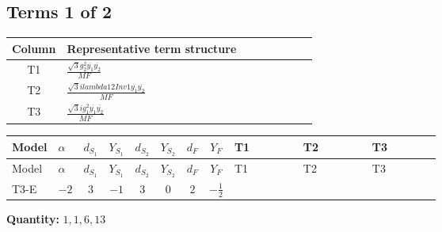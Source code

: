 \documentclass[8pt]{article}
\begin{document}
\begin{landscape}
\subsection*{Terms 1 of 2}
\begin{center}
\begin{tabular}{@{}c >{\raggedright\arraybackslash}p{0.82\linewidth}@{}}
\toprule
Column & Representative term structure \\
\midrule
T1 & \(\displaystyle \frac{\sqrt{3} g_{2}^{2} \overline{y_{1}} \overline{y_{2}}}{MF}\) \\
\midrule
T2 & \(\displaystyle \frac{\sqrt{3} i lambda12Inv1 \overline{y_{1}} \overline{y_{2}}}{MF}\) \\
\midrule
T3 & \(\displaystyle \frac{\sqrt{3} i g_{1}^{2} \overline{y_{1}} \overline{y_{2}}}{MF}\) \\
\midrule
\bottomrule
\end{tabular}
\end{center}
\smallskip
\tiny
\begin{longtable}{@{}llcccccc >{\raggedright\arraybackslash}p{0.21\linewidth} >{\raggedright\arraybackslash}p{0.21\linewidth} >{\raggedright\arraybackslash}p{0.21\linewidth}@{}}
\toprule
Model & $\alpha$ & $d_{S_1}$ & $Y_{S_1}$ & $d_{S_2}$ & $Y_{S_2}$ & $d_F$ & $Y_F$ & T1 & T2 & T3 \\
\midrule
\endfirsthead
\toprule
Model & $\alpha$ & $d_{S_1}$ & $Y_{S_1}$ & $d_{S_2}$ & $Y_{S_2}$ & $d_F$ & $Y_F$ & T1 & T2 & T3 \\
\midrule
\endhead
T3-E & $-2$ & $3$ & $-1$ & $3$ & $0$ & $2$ & $-\frac{1}{2}$ & \scriptsize\adjustbox{max width=\linewidth}{$\begin{gathered} - \frac{\sqrt{3} g_{2}^{2} \overline{y_{1}} \overline{y_{2}}}{6 MF}\end{gathered}$} & \scriptsize\adjustbox{max width=\linewidth}{$\begin{gathered} - \frac{\sqrt{3} i lambda12Inv1 \overline{y_{1}} \overline{y_{2}}}{6 MF}\end{gathered}$} & \scriptsize\adjustbox{max width=\linewidth}{$\begin{gathered} \frac{\sqrt{3} i g_{1}^{2} \overline{y_{1}} \overline{y_{2}}}{8 MF}\end{gathered}$} \\
\midrule
\bottomrule
\end{longtable}
\clearpage
\noindent\textbf{Quantity: }$\mathrm{1,1,6,13}$\par\smallskip

\end{landscape}
\end{document}
